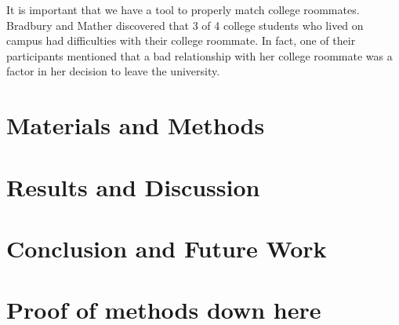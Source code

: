 \documentclass[journal]{./IEEE/IEEEtran}
\begin{document}
    It is important that we have a tool to properly match college roommates. Bradbury and Mather discovered that 3 of 4 college students who lived on campus had difficulties with their college roommate. In fact, one of their participants mentioned that a bad relationship with her college roommate was a factor in her decision
    to leave the university\cite{bradbury}.



\section{Materials and Methods}

\section{Results and Discussion}
\section{Conclusion and Future Work}
\appendices

\section{Proof of methods down here}

\section{}
\end{document}
